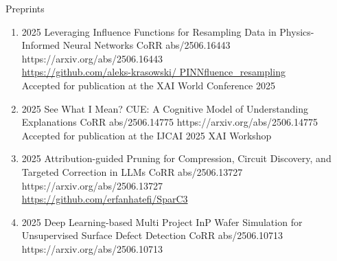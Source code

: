 \headedsubsection %
{Preprints}{}
{
    \begin{enumerate}
    
    
    
            \item {}
                {2025}
                {Leveraging Influence Functions for Resampling Data in Physics-Informed Neural Networks}
                {CoRR abs/2506.16443}
                {https://arxiv.org/abs/2506.16443}
                {
                    \\\href{https://github.com/aleks-krasowski/
PINNfluence_resampling}{https://github.com/aleks-krasowski/
PINNfluence\_resampling}
                    \\ Accepted for publication at the XAI World Conference 2025
                }
    
    
    
         \item {}
                 {2025}
                 {See What I Mean? CUE: A Cognitive Model of Understanding Explanations}
                 {CoRR abs/2506.14775}
                 {https://arxiv.org/abs/2506.14775}
                 {
                      \\Accepted for publication at the IJCAI 2025 XAI Workshop
                 }
        
    
        \item {}
                 {2025}
                 {Attribution-guided Pruning for Compression, Circuit Discovery, and Targeted Correction in LLMs}
                 {CoRR abs/2506.13727}
                 {https://arxiv.org/abs/2506.13727}
                 {
                     \\ \href{https://github.com/erfanhatefi/SparC3}{https://github.com/erfanhatefi/SparC3}
                 }
        
    
    
    
        \item {}
                        {2025}
                        {Deep Learning-based Multi Project InP Wafer Simulation for Unsupervised Surface Defect Detection}
                        {CoRR abs/2506.10713}
                        {https://arxiv.org/abs/2506.10713}
    

\end{enumerate}}
